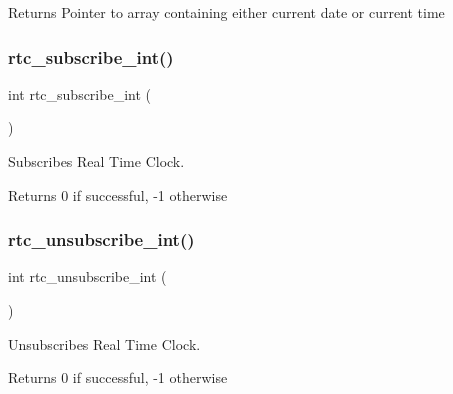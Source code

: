 \begin{DoxyReturn}{Returns}
Pointer to array containing either current date or current time 
\end{DoxyReturn}
\hypertarget{group__rtc_gabd8de825e876e8ef94c64ac616f68a11}{}\label{group__rtc_gabd8de825e876e8ef94c64ac616f68a11} 
\subsubsection{\texorpdfstring{rtc\+\_\+subscribe\+\_\+int()}{rtc\_subscribe\_int()}}
{\footnotesize\ttfamily int rtc\+\_\+subscribe\+\_\+int (\begin{DoxyParamCaption}{ }\end{DoxyParamCaption})}



Subscribes Real Time Clock. 

\begin{DoxyReturn}{Returns}
0 if successful, -\/1 otherwise 
\end{DoxyReturn}
\hypertarget{group__rtc_gab8f17bf5280c908c8b199a90fefcc758}{}\label{group__rtc_gab8f17bf5280c908c8b199a90fefcc758} 
\subsubsection{\texorpdfstring{rtc\+\_\+unsubscribe\+\_\+int()}{rtc\_unsubscribe\_int()}}
{\footnotesize\ttfamily int rtc\+\_\+unsubscribe\+\_\+int (\begin{DoxyParamCaption}{ }\end{DoxyParamCaption})}



Unsubscribes Real Time Clock. 

\begin{DoxyReturn}{Returns}
0 if successful, -\/1 otherwise 
\end{DoxyReturn}
